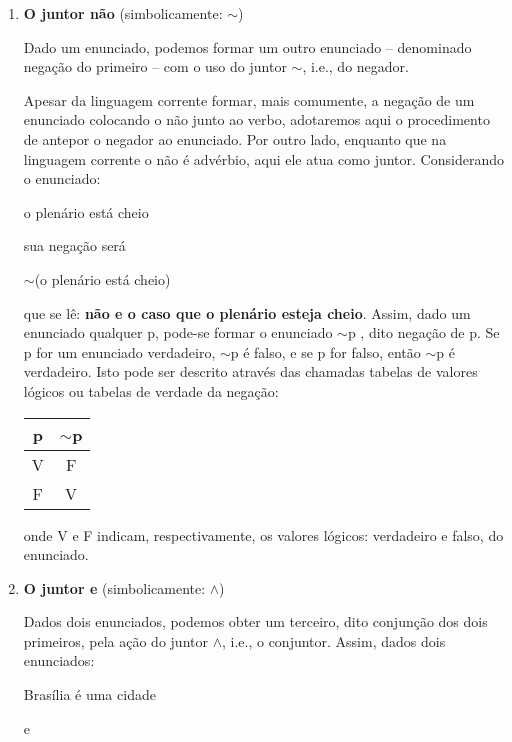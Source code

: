 \begin{enumerate}[label=\textbf{(\arabic*)}]
    \item \textbf{O juntor não} (simbolicamente: $\sim$)

    Dado um enunciado, podemos formar um outro enunciado -- denominado negação do primeiro -- com o uso do juntor $\sim$, i.e., do negador.

    Apesar da linguagem corrente formar, mais comumente, a negação de  um  enunciado colocando o não junto ao verbo, adotaremos aqui o procedimento de antepor o negador ao enunciado.
    Por outro lado, enquanto que na  linguagem corrente o não é advérbio, aqui ele atua como juntor.
    Considerando o enunciado:

    \begin{center}
        o plenário está cheio
    \end{center}
    sua negação será
    \begin{center}
        $\sim$(o plenário está cheio)
    \end{center}
    que se lê: \textbf{não e o caso que o plenário esteja cheio}.
    Assim, dado um enunciado qualquer p, pode-se formar o  enunciado $\sim$p , dito negação de p.
    Se p for um enunciado verdadeiro, $\sim$p é falso, e se p  for falso, então $\sim$p é verdadeiro.
    Isto pode ser descrito através das chamadas tabelas de valores lógicos ou tabelas de verdade da negação:

    \begin{center}
        \begin{tabular}{c c}
            p & $\sim$p \\ \hline
            V & F \\
            F & V
        \end{tabular}
    \end{center}

    onde V e F indicam, respectivamente, os valores lógicos: verdadeiro e falso, do enunciado.

    \item \textbf{O juntor e} (simbolicamente: $\land$)

    Dados dois enunciados, podemos obter um  terceiro, dito conjunção dos dois primeiros, pela ação do  juntor $\land$, i.e., o conjuntor.
    Assim, dados dois enunciados:

    \begin{center}
        Brasília é uma cidade

        e


\end{center}
\end{enumerate}
